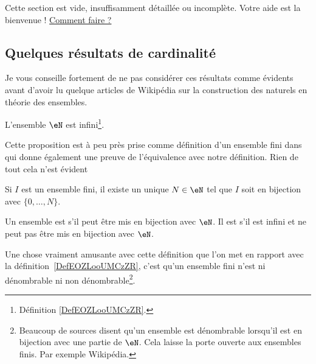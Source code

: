 Cette section est vide, insuffisamment détaillée ou incomplète. Votre aide est la bienvenue ! \hyperref[SecooCKWWooBFgnea]{Comment faire ?}

\subsection{Quelques résultats de cardinalité}

Je vous conseille fortement de ne pas considérer ces résultats comme évidents avant d'avoir lu quelque articles de Wikipédia sur la construction des naturels en théorie des ensembles.
\begin{proposition}     \label{PROPooBYKCooGDkfWy}
    L'ensemble \( \eN\) est infini\footnote{Définition \ref{DefEOZLooUMCzZR}.}.
\end{proposition}

Cette proposition est à peu près prise comme définition d'un ensemble fini dans \cite{ooVAYLooJxVYex} qui donne également une preuve de l'équivalence avec notre définition. Rien de tout cela n'est évident
\begin{proposition}     \label{PROPooJLGKooDCcnWi}
    Si \( I\) est un ensemble fini, il existe un unique \( N\in \eN\) tel que \( I\) soit en bijection avec \( \{ 0,\ldots, N \}\).
\end{proposition}
\begin{definition}\label{DefEnsembleDenombrable}
    Un ensemble est  s'il peut être mis en bijection avec \( \eN\). Il est  s'il est infini et ne peut pas être mis en bijection avec \( \eN\).
\end{definition}
Une chose vraiment amusante avec cette définition que l'on met en rapport avec la définition~\ref{DefEOZLooUMCzZR}, c'est qu'un ensemble fini n'est ni dénombrable ni non dénombrable\footnote{Beaucoup de sources disent qu'un ensemble est dénombrable lorsqu'il est en bijection avec une partie de \( \eN\). Cela laisse la porte ouverte aux ensembles finis. Par exemple Wikipédia\cite{ooLMVKooUiQUtb}.}.

